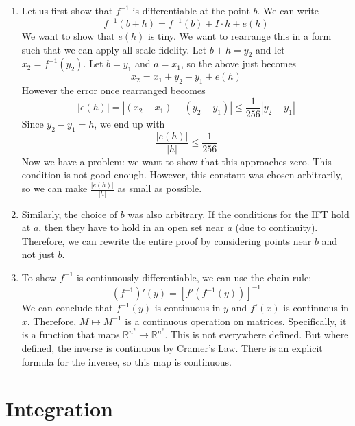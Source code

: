 \documentclass{article}
\numberwithin{equation}{section}
\begin{document}
\begin{enumerate}
    \item Let us first show that $f^{-1}$ is differentiable at the point $b$. We can write
          \begin{equation}
              f^{-1}(b+h) = f^{-1}(b) + I\cdot h + e(h)
          \end{equation}
          We want to show that $e(h)$ is tiny. We want to rearrange this in a form such that we can apply all scale fidelity. Let $b+h = y_2$ and let $x_2=f^{-1}(y_2).$ Let $b=y_1$ and $a=x_1$, so the above just becomes
          \begin{equation}
              x_2 = x_1 + y_2-y_1 + e(h)
          \end{equation}
          However the error once rearranged becomes
          \begin{equation}
              |e(h)| = |(x_2-x_1)-(y_2-y_1)| \le \frac{1}{256}|y_2-y_1|
          \end{equation}
          Since $y_2-y_1=h$, we end up with
          \begin{equation}
              \frac{|e(h)|}{|h|} \le \frac{1}{256}
          \end{equation}
          Now we have a problem: we want to show that this approaches zero. This condition is not good enough. However, this constant was chosen arbitrarily, so we can make $\frac{|e(h)|}{|h|}$ as small as possible.
    \item Similarly, the choice of $b$ was also arbitrary. If the conditions for the IFT hold at $a$, then they have to hold in an open set near $a$ (due to continuity). Therefore, we can rewrite the entire proof by considering points near $b$ and not just $b$.
    \item To show $f^{-1}$ is continuously differentiable, we can use the chain rule:
          \begin{equation}
              (f^{-1})'(y) = [f'(f^{-1}(y))]^{-1}
          \end{equation}
          We can conclude that $f^{-1}(y)$ is continuous in $y$ and $f'(x)$ is continuous in $x$. Therefore, $M \mapsto M^{-1}$ is a continuous operation on matrices. Specifically, it is a function that maps $\mathbb{R}^{n^2}\rightarrow \mathbb{R}^{n^2}.$ This is not everywhere defined. But where defined, the inverse is continuous by Cramer's Law. There is an explicit formula for the inverse, so this map is continuous.
\end{enumerate}

\newpage
\section{Integration}
\end{document}
